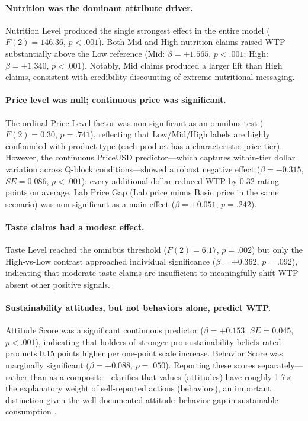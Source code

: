 \paragraph{Nutrition was the dominant attribute driver.} Nutrition Level produced the single strongest effect in the entire model ($F(2)=146.36$, $p<.001$). Both Mid and High nutrition claims raised WTP substantially above the Low reference (Mid: $\beta=+1.565$, $p<.001$; High: $\beta=+1.340$, $p<.001$). Notably, Mid claims produced a larger lift than High claims, consistent with credibility discounting of extreme nutritional messaging.

\paragraph{Price level was null; continuous price was significant.} The ordinal Price Level factor was non-significant as an omnibus test ($F(2)=0.30$, $p=.741$), reflecting that Low/Mid/High labels are highly confounded with product type (each product has a characteristic price tier). However, the continuous PriceUSD predictor---which captures within-tier dollar variation across Q-block conditions---showed a robust negative effect ($\beta=-0.315$, $SE=0.086$, $p<.001$): every additional dollar reduced WTP by 0.32 rating points on average. Lab Price Gap (Lab price minus Basic price in the same scenario) was non-significant as a main effect ($\beta=+0.051$, $p=.242$).

\paragraph{Taste claims had a modest effect.} Taste Level reached the omnibus threshold ($F(2)=6.17$, $p=.002$) but only the High-vs-Low contrast approached individual significance ($\beta=+0.362$, $p=.092$), indicating that moderate taste claims are insufficient to meaningfully shift WTP absent other positive signals.

\paragraph{Sustainability attitudes, but not behaviors alone, predict WTP.} Attitude Score was a significant continuous predictor ($\beta=+0.153$, $SE=0.045$, $p<.001$), indicating that holders of stronger pro-sustainability beliefs rated products 0.15 points higher per one-point scale increase. Behavior Score was marginally significant ($\beta=+0.088$, $p=.050$). Reporting these scores separately---rather than as a composite---clarifies that values (attitudes) have roughly 1.7$\times$ the explanatory weight of self-reported actions (behaviors), an important distinction given the well-documented attitude--behavior gap in sustainable consumption \citep{kollmuss2002}.

